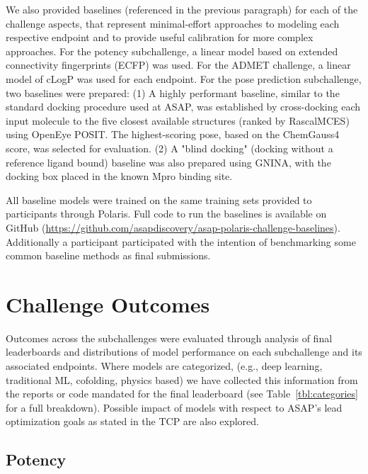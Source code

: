 \documentclass[journal=jcim,manuscript=article]{achemso}
\begin{document}
{We also provided baselines (referenced in the previous paragraph) for each of the challenge aspects, that represent minimal-effort approaches to modeling each respective endpoint and to provide useful calibration for more complex approaches. For the potency subchallenge, a linear model based on extended connectivity fingerprints (ECFP)\cite{ecfp_2010} was used. For the ADMET challenge, a linear model of cLogP\cite{clogp_1999} was used for each endpoint. For the pose prediction subchallenge, two baselines were prepared: (1) A highly performant baseline, similar to the standard docking procedure used at ASAP, was established by cross-docking each input molecule to the five closest available structures (ranked by RascalMCES\cite{raymond_rascal_2002, rdkit}) using OpenEye POSIT\cite{kelley_posit_2015}. The highest-scoring pose, based on the ChemGauss4\cite{oetk} score, was selected for evaluation. (2) A "blind docking" (docking without a reference ligand bound) baseline was also prepared using GNINA\cite{mcnutt_gnina_2025}, with the docking box placed in the known Mpro binding site. 

All baseline models were trained on the same training sets provided to participants through Polaris. Full code to run the baselines is available on GitHub (\url{https://github.com/asapdiscovery/asap-polaris-challenge-baselines}). Additionally a participant participated with the intention of benchmarking some common baseline methods as final submissions\cite{beauty_baseline_2025}. 

\section{Challenge Outcomes}

Outcomes across the subchallenges were evaluated through analysis of final leaderboards and distributions of model performance on each subchallenge and its associated endpoints. Where models are categorized, (e.g., deep learning, traditional ML, cofolding, physics based) we have collected this information from the reports or code mandated for the final leaderboard (see Table~\ref{tbl:categories} for a full breakdown). Possible impact of models with respect to ASAP's lead optimization goals as stated in the TCP\cite{sars_mers_tcp} are also explored. 

\subsection{Potency}


}
\end{document}
